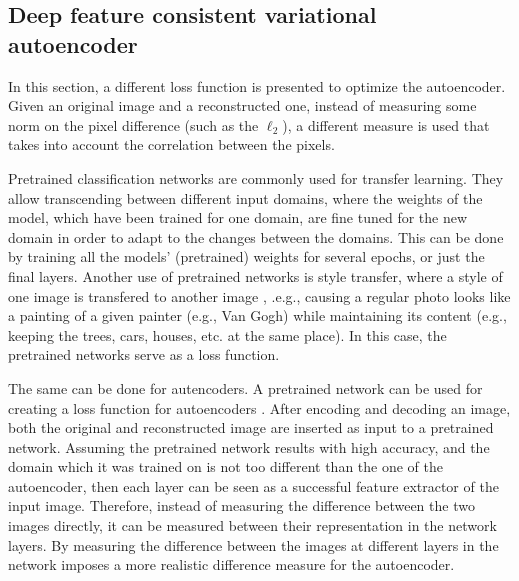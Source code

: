 \documentclass[graybox]{svmult}
\begin{document}
\subsection{Deep feature consistent variational autoencoder}
In this section, a different loss function is presented to optimize the autoencoder. Given an original image and a reconstructed one, instead of measuring some norm on the pixel difference (such as the $\ell_2$), a different measure is used that takes into account the correlation between the pixels.

Pretrained classification networks are commonly used for transfer learning. They allow transcending between different input domains, where the weights of the model, which have been trained for one domain, are fine tuned for the new domain in order to adapt to the changes between the domains. This can be done by training all the models' (pretrained) weights for several epochs, or just the final layers. 
Another use  of pretrained networks is style transfer, where a style of one image is transfered to another image \cite{style_transfer}, .e.g., causing a regular photo looks like a painting of a given painter (e.g., Van Gogh) while maintaining its content (e.g., keeping the trees, cars, houses, etc. at the same place). In this case, the pretrained networks serve as a loss function. 

The same can be done for autencoders. A pretrained network can be used for creating a loss function for autoencoders \cite{Deep_feature_VAE}. After encoding and decoding an image, both the original and reconstructed image are inserted as input to a pretrained network. Assuming the pretrained network results with high accuracy, and the domain which it was trained on is not too different than the one of the autoencoder, then each layer can be seen as a successful feature extractor of the input image. Therefore, instead of measuring the difference between the two images directly, it can be measured between their representation in the network layers.
By measuring the difference between the images at different layers in the network imposes a more realistic difference measure for the autoencoder.
\end{document}

